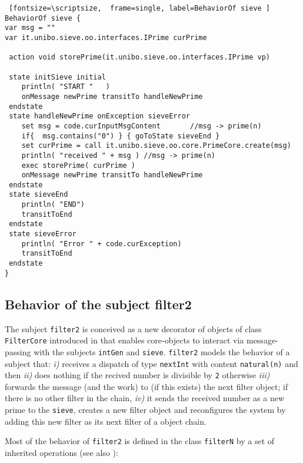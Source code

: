 \documentclass{../llncs}
\begin{document}
\begin{Verbatim} [fontsize=\scriptsize,  frame=single, label=BehaviorOf sieve ] 
BehaviorOf sieve {
var msg = ""	
var it.unibo.sieve.oo.interfaces.IPrime curPrime
   
 action void storePrime(it.unibo.sieve.oo.interfaces.IPrime vp)
 		
 state initSieve initial
	println( "START "  	)
	onMessage newPrime transitTo handleNewPrime
 endstate  	 	
 state handleNewPrime onException sieveError
	set msg = code.curInputMsgContent		//msg -> prime(n)
	if{  msg.contains("0") } { goToState sieveEnd }
	set curPrime = call it.unibo.sieve.oo.core.PrimeCore.create(msg)  
	println( "received " + msg ) //msg -> prime(n)
	exec storePrime( curPrime )
	onMessage newPrime transitTo handleNewPrime
 endstate	 	
 state sieveEnd 
	println( "END")
	transitToEnd   	
 endstate
 state sieveError
	println( "Error " + code.curException)
	transitToEnd   	
 endstate   
}
\end{Verbatim}

\subsection{Behavior of the subject filter2}
The subject \texttt{filter2} is conceived as a new decorator \cite{gof94} of objects of class \texttt{FilterCore} introduced in   that enables core-objects to interact via message-passing with the subjects \texttt{intGen} and \texttt{sieve}. 
%
\texttt{filter2} models the behavior of a subject that: \textit{i)} receives a dispatch of type \texttt{nextInt} with content \texttt{natural(n)} and then \textit{ii)} does nothing if the recived number is divisible by \texttt{2} otherwise \textit{iii)} forwards the message (and the work) to (if this exists) the next filter object; if there is no other filter in the chain, \textit{iv)} it sends the received number as a new prime to the \texttt{sieve}, creates a new filter object and reconfigures the system by adding this new filter as its next filter of a object chain.

Most of the behavior of \texttt{filter2}  is defined in the class \texttt{filterN} by a set of inherited operations (see also ):
\end{document}
